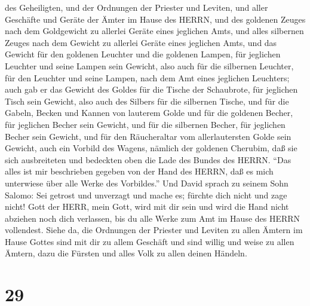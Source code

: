 des Geheiligten,  und der Ordnungen der Priester und
Leviten, und aller Geschäfte und Geräte der Ämter im Hause des HERRN,
 und des goldenen Zeuges nach dem Goldgewicht zu allerlei
Geräte eines jeglichen Amts, und alles silbernen Zeuges nach dem Gewicht
zu allerlei Geräte eines jeglichen Amts,  und das Gewicht
für den goldenen Leuchter und die goldenen Lampen, für jeglichen
Leuchter und seine Lampen sein Gewicht, also auch für die silbernen
Leuchter, für den Leuchter und seine Lampen, nach dem Amt eines
jeglichen Leuchters;  auch gab er das Gewicht des Goldes
für die Tische der Schaubrote, für jeglichen Tisch sein Gewicht, also
auch des Silbers für die silbernen Tische,  und für die
Gabeln, Becken und Kannen von lauterem Golde und für die goldenen
Becher, für jeglichen Becher sein Gewicht, und für die silbernen Becher,
für jeglichen Becher sein Gewicht,  und für den
Räucheraltar vom allerlautersten Golde sein Gewicht, auch ein Vorbild
des Wagens, nämlich der goldenen Cherubim, daß sie sich ausbreiteten und
bedeckten oben die Lade des Bundes des HERRN.  ``Das alles
ist mir beschrieben gegeben von der Hand des HERRN, daß es mich
unterwiese über alle Werke des Vorbildes.''  Und David
sprach zu seinem Sohn Salomo: Sei getrost und unverzagt und mache es;
fürchte dich nicht und zage nicht! Gott der HERR, mein Gott, wird mit
dir sein und wird die Hand nicht abziehen noch dich verlassen, bis du
alle Werke zum Amt im Hause des HERRN vollendest.  Siehe
da, die Ordnungen der Priester und Leviten zu allen Ämtern im Hause
Gottes sind mit dir zu allem Geschäft und sind willig und weise zu allen
Ämtern, dazu die Fürsten und alles Volk zu allen deinen Händeln.

\hypertarget{section-28}{%
\section{29}\label{section-28}}

